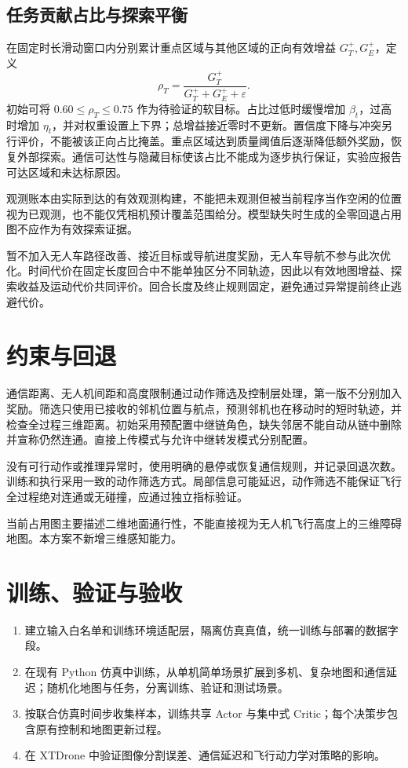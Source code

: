 \documentclass[UTF8,a4paper,11pt,fontset=fandol]{ctexart}
\begin{document}
\subsection{任务贡献占比与探索平衡}
在固定时长滑动窗口内分别累计重点区域与其他区域的正向有效增益 $G_T^+,G_E^+$，定义
\[
 \rho_T=\frac{G_T^+}{G_T^++G_E^++\varepsilon}.
\]
初始可将 $0.60\leq\rho_T\leq0.75$ 作为待验证的软目标。占比过低时缓慢增加 $\beta_t$，过高时增加 $\eta_t$，并对权重设置上下界；总增益接近零时不更新。置信度下降与冲突另行评价，不能被该正向占比掩盖。重点区域达到质量阈值后逐渐降低额外奖励，恢复外部探索。通信可达性与隐藏目标使该占比不能成为逐步执行保证，实验应报告可达区域和未达标原因。

观测账本由实际到达的有效观测构建，不能把未观测但被当前程序当作空闲的位置视为已观测，也不能仅凭相机预计覆盖范围给分。模型缺失时生成的全零回退占用图不应作为有效探索证据。

暂不加入无人车路径改善、接近目标或导航进度奖励，无人车导航不参与此次优化。时间代价在固定长度回合中不能单独区分不同轨迹，因此以有效地图增益、探索收益及运动代价共同评价。回合长度及终止规则固定，避免通过异常提前终止逃避代价。

\section{约束与回退}
通信距离、无人机间距和高度限制通过动作筛选及控制层处理，第一版不分别加入奖励。筛选只使用已接收的邻机位置与航点，预测邻机也在移动时的短时轨迹，并检查全过程三维距离。初始采用预配置中继链角色，缺失邻居不能自动从链中删除并宣称仍然连通。直接上传模式与允许中继转发模式分别配置。

没有可行动作或推理异常时，使用明确的悬停或恢复通信规则，并记录回退次数。训练和执行采用一致的动作筛选方式。局部信息可能延迟，动作筛选不能保证飞行全过程绝对连通或无碰撞，应通过独立指标验证。

当前占用图主要描述二维地面通行性，不能直接视为无人机飞行高度上的三维障碍地图。本方案不新增三维感知能力。

\section{训练、验证与验收}
\begin{enumerate}
  \item 建立输入白名单和训练环境适配层，隔离仿真真值，统一训练与部署的数据字段。
  \item 在现有 Python 仿真中训练，从单机简单场景扩展到多机、复杂地图和通信延迟；随机化地图与任务，分离训练、验证和测试场景。
  \item 按联合仿真时间步收集样本，训练共享 Actor 与集中式 Critic；每个决策步包含原有控制和地图更新过程。
  \item 在 XTDrone 中验证图像分割误差、通信延迟和飞行动力学对策略的影响。
\end{enumerate}
\end{document}
